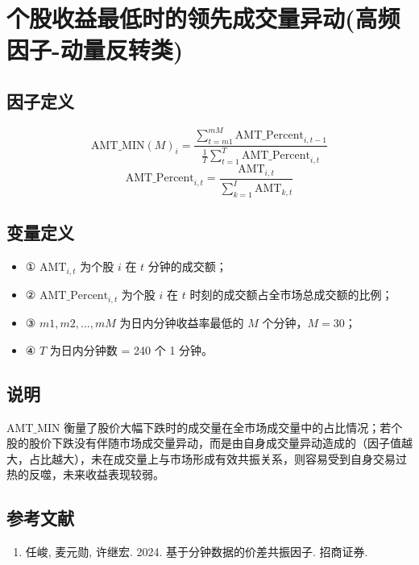 \documentclass{article}
\begin{document}
\section{个股收益最低时的领先成交量异动(高频因子-动量反转类)}

\subsection{因子定义}
\begin{equation}
    \mathrm{AMT\_MIN}(M)_i = \frac{\sum_{t=m1}^{mM} \mathrm{AMT\_Percent}_{i,t-1}}{\frac{1}{T}\sum_{t=1}^{T} \mathrm{AMT\_Percent}_{i,t}}
\end{equation}
\begin{equation}
    \mathrm{AMT\_Percent}_{i,t} = \frac{\mathrm{AMT}_{i,t}}{\sum_{k=1}^{I} \mathrm{AMT}_{k,t}}
\end{equation}

\subsection{变量定义}
\begin{itemize}
    \item ① \( \mathrm{AMT}_{i,t} \) 为个股 \( i \) 在 \( t \) 分钟的成交额；
    \item ② \( \mathrm{AMT\_Percent}_{i,t} \) 为个股 \( i \) 在 \( t \) 时刻的成交额占全市场总成交额的比例；
    \item ③ \( m1, m2, \ldots, mM \) 为日内分钟收益率最低的 \( M \) 个分钟，\( M=30 \)；
    \item ④ \( T \) 为日内分钟数 = 240 个 1 分钟。
\end{itemize}

\subsection{说明}
\( \mathrm{AMT\_MIN} \) 衡量了股价大幅下跌时的成交量在全市场成交量中的占比情况；若个股的股价下跌没有伴随市场成交量异动，而是由自身成交量异动造成的（因子值越大，占比越大），未在成交量上与市场形成有效共振关系，则容易受到自身交易过热的反噬，未来收益表现较弱。

\subsection{参考文献}
\begin{enumerate}
    \item 任峻, 麦元勋, 许继宏. 2024. 基于分钟数据的价差共振因子. 招商证券.
\end{enumerate}
\end{document}
